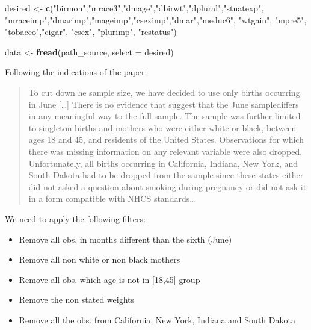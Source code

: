 \documentclass[]{book}
\newenvironment{Shaded}{\begin{snugshade}}{\end{snugshade}}
\newcommand{\KeywordTok}[1]{\textcolor[rgb]{0.13,0.29,0.53}{\textbf{#1}}}
\newcommand{\DataTypeTok}[1]{\textcolor[rgb]{0.13,0.29,0.53}{#1}}
\newcommand{\StringTok}[1]{\textcolor[rgb]{0.31,0.60,0.02}{#1}}
\newcommand{\NormalTok}[1]{#1}
\providecommand{\tightlist}{%
  \setlength{\itemsep}{0pt}\setlength{\parskip}{0pt}}
\begin{document}
\begin{Shaded}
\begin{Highlighting}[]
\NormalTok{desired <-}\StringTok{ }\KeywordTok{c}\NormalTok{(}\StringTok{"birmon"}\NormalTok{,}\StringTok{"mrace3"}\NormalTok{,}\StringTok{"dmage"}\NormalTok{,}\StringTok{"dbirwt"}\NormalTok{,}\StringTok{"dplural"}\NormalTok{,}\StringTok{"stnatexp"}\NormalTok{,}
             \StringTok{"mraceimp"}\NormalTok{,}\StringTok{"dmarimp"}\NormalTok{,}\StringTok{"mageimp"}\NormalTok{,}\StringTok{"cseximp"}\NormalTok{,}\StringTok{"dmar"}\NormalTok{,}\StringTok{"meduc6"}\NormalTok{, }
             \StringTok{"wtgain"}\NormalTok{, }\StringTok{"mpre5"}\NormalTok{, }\StringTok{"tobacco"}\NormalTok{,}\StringTok{"cigar"}\NormalTok{, }\StringTok{"csex"}\NormalTok{, }\StringTok{"plurimp"}\NormalTok{, }\StringTok{"restatus"}\NormalTok{)}

\NormalTok{data <-}\StringTok{ }\KeywordTok{fread}\NormalTok{(path_source, }\DataTypeTok{select =}\NormalTok{ desired)}
\end{Highlighting}
\end{Shaded}

Following the indications of the paper:

\begin{quote}
To cut down he sample size, we have decided to use only births occurring
in June {[}\ldots{}{]} There is no evidence that suggest that the June
samplediffers in any meaningful way to the full sample. The sample was
further limited to singleton births and mothers who were either white or
black, between ages 18 and 45, and residents of the United States.
Observations for which there was missing information on any relevant
variable were also dropped. Unfortunately, all births occurring in
California, Indiana, New York, and South Dakota had to be dropped from
the sample since these states either did not asked a question about
smoking during pregnancy or did not ask it in a form compatible with
NHCS standards\ldots{}
\end{quote}

We need to apply the following filters:

\begin{itemize}
\tightlist
\item
  Remove all obs. in months different than the sixth (June)
\item
  Remove all non white or non black mothers
\item
  Remove all obs. which age is not in {[}18,45{]} group
\item
  Remove the non stated weights
\item
  Remove all the obs. from California, New York, Indiana and South
  Dakota
\end{itemize}
\end{document}
